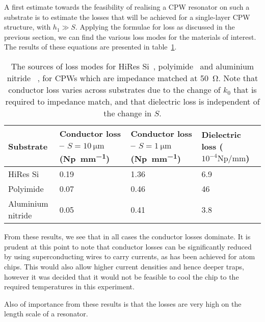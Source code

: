 A first estimate towards the feasibility of realising a CPW resonator on such a
substrate is to estimate the losses that will be achieved for a single-layer CPW
structure, with $h_1 \gg S$. Applying the formulae for loss as discussed in the
previous section, we can find the various loss modes for the materials of
interest. The results of these equations are presented in
table~\ref{table:losses}.

\begin{table}[h]
  \begin{tabularx}{\textwidth}{lXXX}
    Substrate &
    Conductor loss -- $S=\SI{10}{\micro\meter}$ (\si{\neper \per \milli \meter})
    & Conductor loss -- $S=\SI{1}{\micro\meter}$ (\si{\neper \per \milli \meter})
    & Dielectric loss ($10^{-4}\si{\neper \per \milli \meter}$) \\
    \hline
    HiRes Si & 0.19 & 1.36 & 6.9 \\
    Polyimide & 0.07 & 0.46 & 46 \\
    Aluminium nitride & 0.05 & 0.41 & 3.8
  \end{tabularx}
    \caption{
       The sources
      of loss modes for HiRes Si~\cite{1717770, 517417},
      polyimide~\cite{5734805}  and aluminium nitride~\cite{1666171} , for CPWs which are impedance matched at \SI{50}{\ohm}.
      Note that conductor loss varies across substrates due to the change of
      $k_0$ that is required to impedance match, and that dielectric loss is
      independent of the change in $S$. }
    \label{table:losses}
\end{table}

From these results, we see that in all cases the conductor losses dominate.  It
  is prudent at this point to note that conductor losses can be significantly
  reduced by using superconducting wires to carry currents, as has been achieved
  for atom chips\cite{PhysRevLett.97.200405, Hattermann2017}. This would also
  allow higher current densities and hence deeper traps, however it was decided
  that it would not be feasible to cool the chip to the required temperatures in
  this experiment.

Also of importance from these results is that the losses are very high on the
  length scale of a resonator. 
